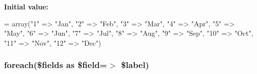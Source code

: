 {\bfseries Initial value\-:}
\begin{DoxyCode}
= array(\textcolor{stringliteral}{"1"} => \textcolor{stringliteral}{"Jan"},
                        \textcolor{stringliteral}{"2"} => \textcolor{stringliteral}{"Feb"},
                        \textcolor{stringliteral}{"3"} => \textcolor{stringliteral}{"Mar"},
                        \textcolor{stringliteral}{"4"} => \textcolor{stringliteral}{"Apr"},
                        \textcolor{stringliteral}{"5"} => \textcolor{stringliteral}{"May"},
                        \textcolor{stringliteral}{"6"} => \textcolor{stringliteral}{"Jun"},
                        \textcolor{stringliteral}{"7"} => \textcolor{stringliteral}{"Jul"},
                        \textcolor{stringliteral}{"8"} => \textcolor{stringliteral}{"Aug"},
                        \textcolor{stringliteral}{"9"} => \textcolor{stringliteral}{"Sep"},
                        \textcolor{stringliteral}{"10"} => \textcolor{stringliteral}{"Oct"},
                        \textcolor{stringliteral}{"11"} => \textcolor{stringliteral}{"Nov"},
                        \textcolor{stringliteral}{"12"} => \textcolor{stringliteral}{"Dec"})
\end{DoxyCode}
\hypertarget{_m_c_mcreate_new_account_8php_a58d12ec81e33be9b80508ee874adb2c1}{
\subsubsection[{foreach}]{\setlength{\rightskip}{0pt plus 5cm}foreach(\$fields as \$field=$>$ \$label)}}\label{_m_c_mcreate_new_account_8php_a58d12ec81e33be9b80508ee874adb2c1}
